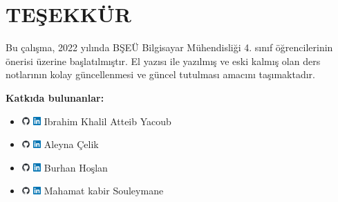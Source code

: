 \section*{TEŞEKKÜR}
Bu çalışma, 2022 yılında BŞEÜ Bilgisayar Mühendisliği 4. sınıf öğrencilerinin önerisi üzerine başlatılmıştır. El yazısı ile yazılmış ve eski kalmış olan ders notlarının kolay güncellenmesi ve güncel tutulması amacını taşımaktadır.

\textbf{Katkıda bulunanlar:}
\begin{itemize}
    \item \href{https://github.com/ikhalilatteib}{\includegraphics[width=0.3cm]{images/github}} \href{https://www.linkedin.com/in/ikhalilatteib/}{\includegraphics[width=0.3cm]{images/linkedIn}} Ibrahim Khalil Atteib Yacoub
    \item \href{https://github.com/Aleyna06}{\includegraphics[width=0.3cm]{images/github}} \href{https://www.linkedin.com/in/aleyna-çelik/}{\includegraphics[width=0.3cm]{images/linkedIn}} Aleyna Çelik
    \item \href{https://github.com/bhoslan}{\includegraphics[width=0.3cm]{images/github}} \href{https://www.linkedin.com/in/bhoslan/}{\includegraphics[width=0.3cm]{images/linkedIn}} Burhan Hoşlan
    \item \href{https://github.com/MahamatKabir}{\includegraphics[width=0.3cm]{images/github}} \href{https://www.linkedin.com/in/mahamat-kabir-souleymane-891b72174/}{\includegraphics[width=0.3cm]{images/linkedIn}} Mahamat kabir Souleymane
\end{itemize}
